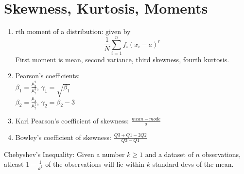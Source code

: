 \documentclass{article}
\begin{document}
\section{Skewness, Kurtosis, Moments}
\begin{enumerate}
    \item rth moment of a distribution: given by 
    \begin{equation}
        \frac{1}{N}\sum_{i = 1}^{n}f_{i}(x_{i}-a)^r
    \end{equation}
    First moment is mean, second variance, third skewness, fourth kurtosis.
    \item Pearson's coefficients: \\
    $\beta_{1} = \frac{\mu_{3}^{2}}{\mu_{2}^{3}}$, $\gamma_{1} = \sqrt{\beta_{1}}$ \\
    $\beta_{2} = \frac{\mu_{4}}{\mu_{2}^{2}}$, $\gamma_{2} = \beta_{2} - 3$
    \item Karl Pearson's coefficient of skewness: $\frac{mean - mode}{\sigma}$
    \item Bowley's coefficient of skewness: $\frac{Q3 + Q1 - 2Q2}{Q3 - Q1}$
\end{enumerate}
\begin{theorem}
    Chebyshev's Inequality: Given a number $k \geq 1$ and a dataset of $n$ observations, 
    atleast $1 - \frac{1}{k^2}$ of the observations will lie within $k$ standard devs of the mean.

\end{theorem}
\end{document}
